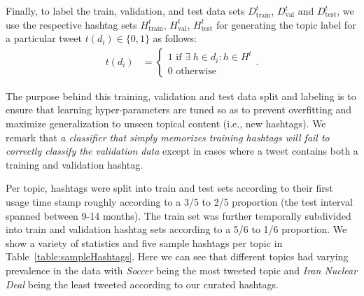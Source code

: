 Finally, to label the train, validation, and test data sets $D^t_\mathrm{train}$, $D^t_\mathrm{val}$ and $D^t_\mathrm{test}$, 
we use the respective
hashtag sets $H^t_\mathrm{train}$, $H^t_\mathrm{val}$, $H^t_\mathrm{test}$ for generating
the topic label for a particular tweet $t(d_{i}) \in \{0,1\}$ as follows:
\begin{align*}
t(d_{i}) & =
  \begin{cases}
    1 \textrm{ if }  \exists \; h \in d_i:  h  \in H^t  \\
    0  \textrm{ otherwise}
  \end{cases} .
\end{align*}




The purpose behind this training, validation and test data split
and labeling is to ensure that learning hyper-parameters are tuned so as
to prevent overfitting and maximize generalization to unseen topical
content (i.e., new hashtags).
We remark that \emph{a classifier that simply
memorizes training hashtags will fail to correctly classify the validation data} except in 
cases where a tweet contains both a training and validation hashtag. 

Per topic, hashtags were split into train and test sets
according to their first usage time stamp roughly according to a 3/5
to 2/5 proportion (the test interval spanned between 9-14 months).  
The train set was further temporally subdivided
into train and validation hashtag sets according to a 5/6 to 1/6
proportion.  We show a variety of statistics and five sample hashtags
per topic in Table~\ref{table:sampleHashtags}.  Here we can see that
different topics had varying prevalence in the data
with \textit{Soccer} being the most tweeted topic
and \textit{Iran Nuclear Deal} being the least tweeted according to our curated
hashtags.


